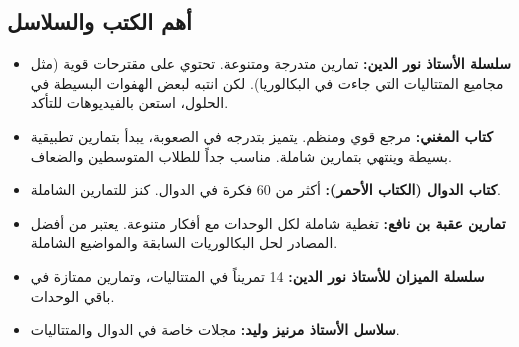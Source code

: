 \documentclass[12pt,a4paper]{book}
\begin{document}
	\subsection{أهم الكتب والسلاسل}
	\begin{itemize}
		\item \textbf{سلسلة الأستاذ نور الدين:} تمارين متدرجة ومتنوعة. تحتوي على مقترحات قوية (مثل مجاميع المتتاليات التي جاءت في البكالوريا). لكن انتبه لبعض الهفوات البسيطة في الحلول، استعن بالفيديوهات للتأكد.
		\item \textbf{كتاب المغني:} مرجع قوي ومنظم. يتميز بتدرجه في الصعوبة، يبدأ بتمارين تطبيقية بسيطة وينتهي بتمارين شاملة. مناسب جداً للطلاب المتوسطين والضعاف.
		\item \textbf{كتاب الدوال (الكتاب الأحمر):} أكثر من 60 فكرة في الدوال. كنز للتمارين الشاملة.
		\item \textbf{تمارين عقبة بن نافع:} تغطية شاملة لكل الوحدات مع أفكار متنوعة. يعتبر من أفضل المصادر لحل البكالوريات السابقة والمواضيع الشاملة.
		\item \textbf{سلسلة الميزان للأستاذ نور الدين:} 14 تمريناً في المتتاليات، وتمارين ممتازة في باقي الوحدات.
		\item \textbf{سلاسل الأستاذ مرنيز وليد:} مجلات خاصة في الدوال والمتتاليات.
	\end{itemize}
	
\end{document}
